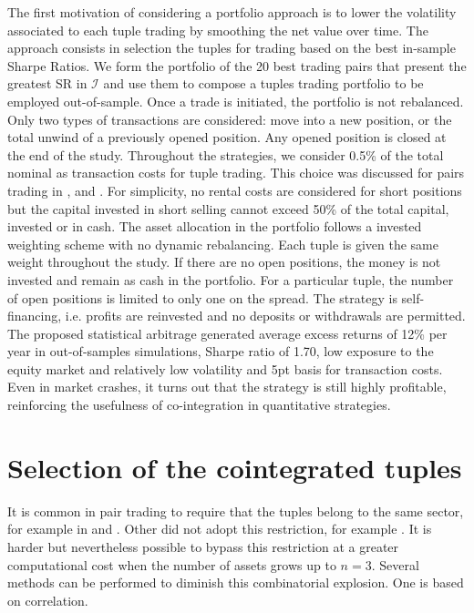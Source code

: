 \documentclass[11pt,a4,twosided,singlespacing,titlepagenumber=on]{scrreprt}
\numberwithin{equation}{chapter} %
\theoremstyle{remark}
\begin{document}
The first motivation of considering a portfolio approach is to lower the volatility associated to each tuple trading by smoothing the net value over time. The approach consists in selection the tuples for trading based on the best in-sample Sharpe Ratios. We form the portfolio of the 20 best trading pairs that present the greatest SR in $\mathcal{I}$ and use them to compose a tuples trading portfolio to be employed out-of-sample. Once a trade is initiated, the portfolio is not rebalanced. Only two types of transactions are considered: move into a new position, or the total unwind of a previously opened position. Any opened position is closed at the end of the study. Throughout the strategies, we consider 0.5\% of the total nominal as transaction costs for tuple trading. This choice was discussed for pairs trading in \cite{dunis2010}, \cite{dunis2005} and \cite{alexander2002}. For simplicity, no rental costs are considered for short positions but the capital invested in short selling cannot exceed 50\% of the total capital, invested or in cash. The asset allocation in the portfolio follows a invested weighting scheme with no dynamic rebalancing. Each tuple is given the same weight throughout the study. If there are no open positions, the money is not invested and remain as cash in the portfolio. For a particular tuple, the number of open positions is limited to only one on the spread. The strategy is self-financing, i.e. profits are reinvested and no deposits or withdrawals are permitted. The proposed statistical arbitrage generated average excess returns of 12\% per year in out-of-samples simulations, Sharpe ratio of 1.70, low exposure to the equity market and relatively low volatility and 5pt basis for transaction costs. Even in market crashes, it turns out that the strategy is still highly profitable, reinforcing the usefulness of co-integration in quantitative strategies.

\section{Selection of the cointegrated tuples}

It is common in pair trading to require that the tuples belong to the same sector, for example in \cite{chan2009} and \cite{dunis2010}. Other did not adopt this restriction, for example \cite{caldeira2013}. It is harder but nevertheless possible to bypass this restriction at a greater computational cost when the number of assets grows up to $n = 3$. Several methods can be performed to diminish this combinatorial explosion. One is based on correlation. 
\end{document}
